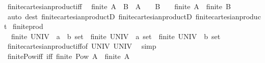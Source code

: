 \begin{isabellebody}
\isanewline
%
\endisadelimproof
\isanewline
{}\isamarkupfalse%
\ finite{\isacharunderscore}{\kern0pt}cartesian{\isacharunderscore}{\kern0pt}product{\isacharunderscore}{\kern0pt}iff{\isacharcolon}{\kern0pt}\isanewline
\ \ {\isachardoublequoteopen}finite\ {\isacharparenleft}{\kern0pt}A\ {\isasymtimes}\ B{\isacharparenright}{\kern0pt}\ {\isasymlongleftrightarrow}\ {\isacharparenleft}{\kern0pt}A\ {\isacharequal}{\kern0pt}\ {\isacharbraceleft}{\kern0pt}{\isacharbraceright}{\kern0pt}\ {\isasymor}\ B\ {\isacharequal}{\kern0pt}\ {\isacharbraceleft}{\kern0pt}{\isacharbraceright}{\kern0pt}\ {\isasymor}\ {\isacharparenleft}{\kern0pt}finite\ A\ {\isasymand}\ finite\ B{\isacharparenright}{\kern0pt}{\isacharparenright}{\kern0pt}{\isachardoublequoteclose}\isanewline
%
\isadelimproof
\ \ %
\endisadelimproof
%
\isatagproof
{}\isamarkupfalse%
\ {\isacharparenleft}{\kern0pt}auto\ dest{\isacharcolon}{\kern0pt}\ finite{\isacharunderscore}{\kern0pt}cartesian{\isacharunderscore}{\kern0pt}productD{}\ finite{\isacharunderscore}{\kern0pt}cartesian{\isacharunderscore}{\kern0pt}productD{}\ finite{\isacharunderscore}{\kern0pt}cartesian{\isacharunderscore}{\kern0pt}product{\isacharparenright}{\kern0pt}%
\endisatagproof
{\isafoldproof}%
%
\isadelimproof
\isanewline
%
\endisadelimproof
\isanewline
{}\isamarkupfalse%
\ finite{\isacharunderscore}{\kern0pt}prod{\isacharcolon}{\kern0pt}\isanewline
\ \ {\isachardoublequoteopen}finite\ {\isacharparenleft}{\kern0pt}UNIV\ {\isacharcolon}{\kern0pt}{\isacharcolon}{\kern0pt}\ {\isacharparenleft}{\kern0pt}{\isacharprime}{\kern0pt}a\ {\isasymtimes}\ {\isacharprime}{\kern0pt}b{\isacharparenright}{\kern0pt}\ set{\isacharparenright}{\kern0pt}\ {\isasymlongleftrightarrow}\ finite\ {\isacharparenleft}{\kern0pt}UNIV\ {\isacharcolon}{\kern0pt}{\isacharcolon}{\kern0pt}\ {\isacharprime}{\kern0pt}a\ set{\isacharparenright}{\kern0pt}\ {\isasymand}\ finite\ {\isacharparenleft}{\kern0pt}UNIV\ {\isacharcolon}{\kern0pt}{\isacharcolon}{\kern0pt}\ {\isacharprime}{\kern0pt}b\ set{\isacharparenright}{\kern0pt}{\isachardoublequoteclose}\isanewline
%
\isadelimproof
\ \ %
\endisadelimproof
%
\isatagproof
{}\isamarkupfalse%
\ finite{\isacharunderscore}{\kern0pt}cartesian{\isacharunderscore}{\kern0pt}product{\isacharunderscore}{\kern0pt}iff{\isacharbrackleft}{\kern0pt}of\ UNIV\ UNIV{\isacharbrackright}{\kern0pt}\ \isamarkupfalse%
\ simp%
\endisatagproof
{\isafoldproof}%
%
\isadelimproof
\isanewline
%
\endisadelimproof
\isanewline
{}\isamarkupfalse%
\ finite{\isacharunderscore}{\kern0pt}Pow{\isacharunderscore}{\kern0pt}iff\ {\isacharbrackleft}{\kern0pt}iff{\isacharbrackright}{\kern0pt}{\isacharcolon}{\kern0pt}\ {\isachardoublequoteopen}finite\ {\isacharparenleft}{\kern0pt}Pow\ A{\isacharparenright}{\kern0pt}\ {\isasymlongleftrightarrow}\ finite\ A{\isachardoublequoteclose}\isanewline

\end{isabellebody}
